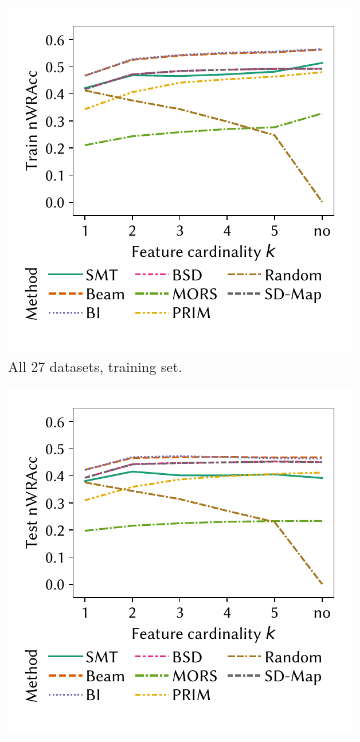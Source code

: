 \documentclass[acmsmall]{acmart} %
\theoremstyle{acmplain}
\theoremstyle{acmdefinition}
\begin{document}
\begin{figure}[t]
	\centering
	\begin{subfigure}[t]{0.48\textwidth}
		\centering
		\includegraphics[width=\textwidth, trim=10 25 10 10, clip]{plots/csd-cardinality-train-nwracc-all-datasets.pdf}
		\caption{All 27 datasets, training set.}
		\label{fig:csd:cardinality-train-nwracc-all-datasets}
	\end{subfigure}
	\hfill
	\begin{subfigure}[t]{0.48\textwidth}
		\centering
		\includegraphics[width=\textwidth, trim=10 25 10 10, clip]{plots/csd-cardinality-test-nwracc-all-datasets.pdf}

\end{subfigure}
\end{figure}
\end{document}
